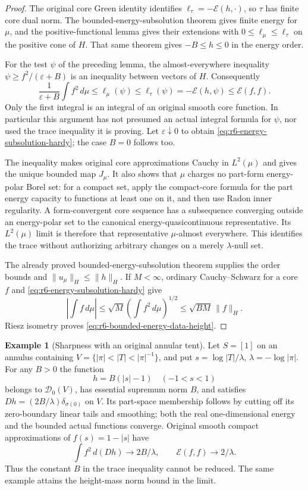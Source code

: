 \documentclass[11pt,a4paper]{article}
\numberwithin{equation}{section}
\theoremstyle{definition}
\newtheorem{example}[theorem]{Example}
\theoremstyle{remark}
\begin{document}
\begin{proof}
The original core Green identity identifies
$\ell_\tau=-\mathcal E(h,\cdot)$, so $\tau$ has finite core dual
norm. The bounded-energy-subsolution theorem gives finite energy
for $\mu$, and the positive-functional lemma gives their extensions
with $0\le\ell_\mu\le\ell_\tau$ on the positive cone of $H$.
That same theorem gives $-B\le h\le0$ in the energy order.

For the test $\psi$ of the preceding lemma, the almost-everywhere
inequality
$\psi\ge f^2/(\varepsilon+B)$ is an inequality between vectors
of $H$. Consequently
\[
 \frac1{\varepsilon+B}\int f^2\,d\mu
     \le\ell_\mu(\psi)
     \le\ell_\tau(\psi)
     =-\mathcal E(h,\psi)
     \le\mathcal E(f,f).
\]
Only the first integral is an integral of an original smooth core
function. In particular this argument has not presumed an actual
integral formula for $\psi$, nor used the trace inequality it is
proving. Let $\varepsilon\downarrow0$ to obtain
\eqref{eq:r6-energy-subsolution-hardy}; the case $B=0$ follows too.

The inequality makes original core approximations Cauchy in
$L^2(\mu)$ and gives the unique bounded map $J_\mu$. It also shows
that $\mu$ charges no part-form energy-polar Borel set: for a compact set,
apply the compact-core formula for the part energy capacity to functions at
least one on it, and then use Radon inner regularity. A form-convergent
core sequence has a subsequence converging outside an energy-polar
set to the canonical energy-quasicontinuous representative. Its
$L^2(\mu)$ limit is therefore that representative $\mu$-almost
everywhere. This identifies the trace without authorizing arbitrary
changes on a merely $\lambda$-null set.

The already proved bounded-energy-subsolution theorem supplies the
order bounds and $\|u_\mu\|_H\le\|h\|_H$. If $M<\infty$, ordinary
Cauchy--Schwarz for a core $f$ and
\eqref{eq:r6-energy-subsolution-hardy} give
\[
 \left|\int f\,d\mu\right|
          \le\sqrt M\left(\int f^2\,d\mu\right)^{1/2}
          \le\sqrt{BM}\,\|f\|_H.
\]
Riesz isometry proves \eqref{eq:r6-bounded-energy-data-height}.
\end{proof}

\begin{example}[Sharpness with an original annular tent]
\label{ex:r6-energy-subsolution-hardy-sharp}
Let $S=[1]$ on an annulus containing
$V=\{|\pi|<|T|<|\pi|^{-1}\}$, and put
$s=\log|T|/\lambda$, $\lambda=-\log|\pi|$.
For any $B>0$ the function
\[
                      h=B(|s|-1)\quad(-1<s<1)
\]
belongs to $\mathscr D_0(V)$, has essential supremum norm $B$,
and satisfies $D h=(2B/\lambda)\delta_{\sigma(0)}$ on $V$.
Its part-space membership follows by cutting off its zero-boundary
linear tails and smoothing; both the real one-dimensional energy
and the bounded actual functions converge. Original smooth compact
approximations of $f(s)=1-|s|$ have
\[
             \int f^2\,d(Dh)\longrightarrow2B/\lambda,
                  \qquad\mathcal E(f,f)\longrightarrow2/\lambda.
\]
Thus the constant $B$ in the trace inequality cannot be reduced.
The same example attains the height-mass norm bound in the limit.
\end{example}
\end{document}
